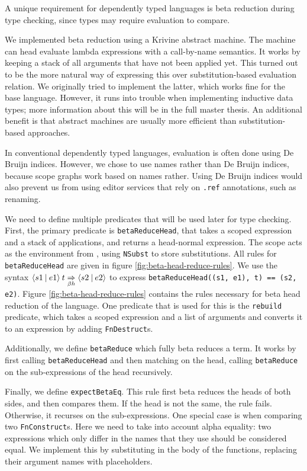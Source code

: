 A unique requirement for dependently typed languages is beta reduction during type checking, since types may require evaluation to compare.

We implemented beta reduction using a Krivine abstract machine\cite{krivine}. The machine can head evaluate lambda expressions with a call-by-name semantics. It works by keeping a stack of all arguments that have not been applied yet. This turned out to be the more natural way of expressing this over substitution-based evaluation relation. We originally tried to implement the latter, which works fine for the base language. However, it runs into trouble when implementing inductive data types; more information about this will be in the full master thesis. An additional benefit is that abstract machines are usually more efficient than substitution-based approaches.

In conventional dependently typed languages, evaluation is often done using De Bruijn indices. However, we chose to use names rather than De Bruijn indices, because scope graphs work based on names rather. Using De Bruijn indices would also prevent us from using editor services that rely on \verb|.ref| annotations, such as renaming.

We need to define multiple predicates that will be used later for type checking. First, the primary predicate is \verb|betaReduceHead|, that takes a scoped expression and a stack of applications, and returns a head-normal expression. The scope acts as the environment from \cite{krivine}, using \verb|NSubst| to store substitutions. All rules for \verb|betaReduceHead| are given in figure \ref{fig:beta-head-reduce-rules}. We use the syntax $\langle s1 \: | \: e1\rangle \: t \underset{\beta h}{\Rightarrow} \langle s2 \: | \: e2\rangle$ to express \verb|betaReduceHead((s1, e1), t) == (s2, e2)|. Figure \ref{fig:beta-head-reduce-rules} contains the rules necessary for beta head reduction of the language. One predicate that is used for this is the \verb|rebuild| predicate, which takes a scoped expression and a list of arguments and converts it to an expression by adding \verb|FnDestruct|s.


Additionally, we define \verb|betaReduce| which fully beta reduces a term. It works by first calling \verb|betaReduceHead| and then matching on the head, calling \verb|betaReduce| on the sub-expressions of the head recursively.

Finally, we define \verb|expectBetaEq|. This rule first beta reduces the heads of both sides, and then compares them. If the head is not the same, the rule fails. Otherwise, it recurses on the sub-expressions. One special case is when comparing two \verb|FnConstruct|s. Here we need to take into account alpha equality: two expressions which only differ in the names that they use should be considered equal. We implement this by substituting in the body of the functions, replacing their argument names with placeholders.



